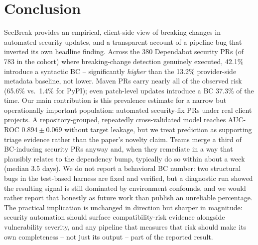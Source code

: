 \documentclass[10pt,journal]{IEEEtran}
\begin{document}
\section{Conclusion}
SecBreak provides an empirical, client-side view of breaking changes in automated security updates, and a transparent account of a pipeline bug that inverted its own headline finding. Across the 380 Dependabot security PRs (of 783 in the cohort) where breaking-change detection genuinely executed, 42.1\% introduce a syntactic BC -- significantly \emph{higher} than the 13.2\% provider-side metadata baseline, not lower. Maven PRs carry nearly all of the observed risk (65.6\% vs.\ 1.4\% for PyPI); even patch-level updates introduce a BC 37.3\% of the time. Our main contribution is this prevalence estimate for a narrow but operationally important population: automated security-fix PRs under real client projects. A repository-grouped, repeatedly cross-validated model reaches AUC-ROC $0.894\pm0.069$ without target leakage, but we treat prediction as supporting triage evidence rather than the paper's novelty claim. Teams merge a third of BC-inducing security PRs anyway and, when they remediate in a way that plausibly relates to the dependency bump, typically do so within about a week (median 3.5 days). We do not report a behavioral BC number: two structural bugs in the test-based harness are fixed and verified, but a diagnostic run showed the resulting signal is still dominated by environment confounds, and we would rather report that honestly as future work than publish an unreliable percentage. The practical implication is unchanged in direction but sharper in magnitude: security automation should surface compatibility-risk evidence alongside vulnerability severity, and any pipeline that measures that risk should make its own completeness -- not just its output -- part of the reported result.
\end{document}
